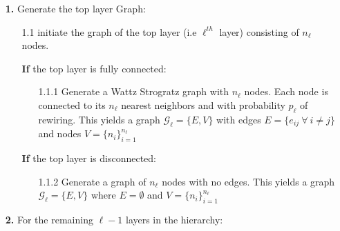 \documentclass[a4paper,12pt]{article}
\begin{document}
	\begin{itemize}
		\item [\bf 1. ] Generate the top layer Graph:
		
			\begin{itemize}
				\item [1.1] initiate the graph of the top layer (i.e $\ell^{th}$ layer) consisting of $n_\ell$ nodes.  
				\item [\bf If] the top layer is fully connected:
				\begin{itemize}
					\item [1.1.1] Generate a Wattz Strogratz graph with $n_\ell$ nodes. Each node is connected to its $n_\ell$ nearest neighbors and with probability $p_\ell$ of rewiring. This yields a graph $\mathcal{G}_\ell = \{E,V\}$ with edges $E =\{ {e_{ij}}\ \forall \ i \neq j\}$ and nodes $V = \{n_i\}_{i =1}^{n_\ell}$
				\end{itemize}
				\item [\bf If] the top layer is disconnected:
				\begin{itemize}
					\item [1.1.2] Generate a graph of $n_\ell$ nodes with no edges. This yields a graph $\mathcal{G}_\ell = \{E, V\}$ where $E = \emptyset$ and $V = \{n_i\}_{i =1}^{n_\ell}$
				\end{itemize}
			\end{itemize}
			
		\item [\bf 2.] For the remaining $\ell - 1$ layers in the hierarchy:
		

\end{itemize}
\end{document}
